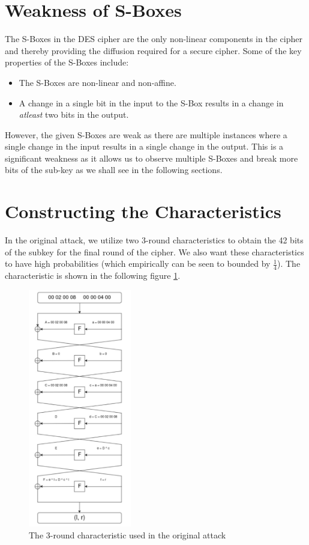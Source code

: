 \documentclass[12pt]{article}
\begin{document}
\section{Weakness of S-Boxes}
The S-Boxes in the DES cipher are the only non-linear components in the cipher and thereby providing the diffusion required for a secure cipher. Some of the key properties of the S-Boxes include:
\begin{itemize}
  \item The S-Boxes are non-linear and non-affine.
  \item A change in a single bit in the input to the S-Box results in a change in \emph{atleast} two bits in the output.
\end{itemize}

However, the given S-Boxes are weak as there are multiple instances where a single change in the input results in a single change in the output. This is a significant weakness as it allows us to observe multiple S-Boxes and break more bits of the sub-key as we shall see in the following sections.

\section{Constructing the Characteristics}
In the original attack, we utilize two 3-round characteristics to obtain the 42 bits of the subkey for the final round of the cipher. We also want these characteristics to have high probabilities (which empirically can be seen to bounded by $\frac{1}{4}$). The characteristic is shown in the following figure \ref{fig:char1}.

\begin{figure}[!h]
  \centering
  \includegraphics[width=0.4\textwidth]{char1.png}
  \caption{The 3-round characteristic used in the original attack}
  \label{fig:char1}
\end{figure}
\end{document}
